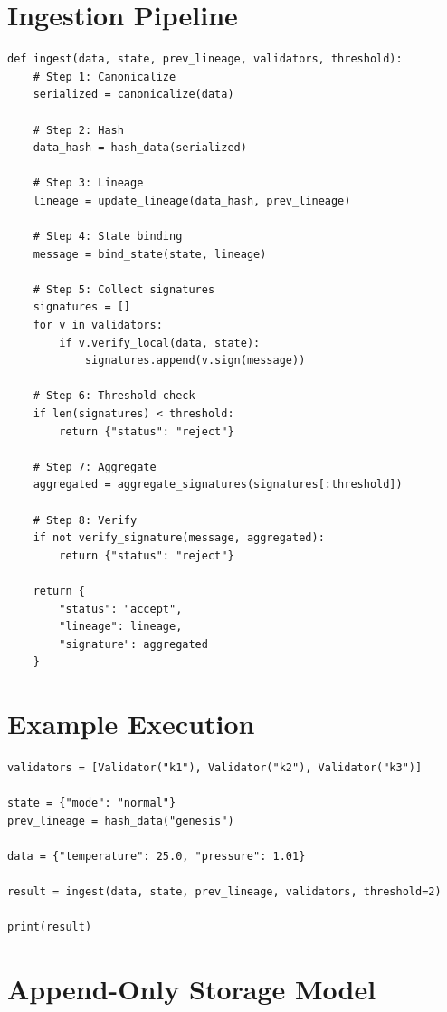 \section{Ingestion Pipeline}

\begin{verbatim}
def ingest(data, state, prev_lineage, validators, threshold):
    # Step 1: Canonicalize
    serialized = canonicalize(data)

    # Step 2: Hash
    data_hash = hash_data(serialized)

    # Step 3: Lineage
    lineage = update_lineage(data_hash, prev_lineage)

    # Step 4: State binding
    message = bind_state(state, lineage)

    # Step 5: Collect signatures
    signatures = []
    for v in validators:
        if v.verify_local(data, state):
            signatures.append(v.sign(message))

    # Step 6: Threshold check
    if len(signatures) < threshold:
        return {"status": "reject"}

    # Step 7: Aggregate
    aggregated = aggregate_signatures(signatures[:threshold])

    # Step 8: Verify
    if not verify_signature(message, aggregated):
        return {"status": "reject"}

    return {
        "status": "accept",
        "lineage": lineage,
        "signature": aggregated
    }
\end{verbatim}

\section{Example Execution}

\begin{verbatim}
validators = [Validator("k1"), Validator("k2"), Validator("k3")]

state = {"mode": "normal"}
prev_lineage = hash_data("genesis")

data = {"temperature": 25.0, "pressure": 1.01}

result = ingest(data, state, prev_lineage, validators, threshold=2)

print(result)
\end{verbatim}

\section{Append-Only Storage Model}

